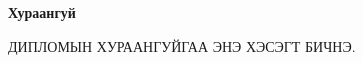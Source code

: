 

\begin{center}
{\scshape\Large \univname\par} %
{\scshape\large \facname\par}\vspace{0.5cm} %
{\huge\textbf{{Хураангуй}} \par}
\bigskip
{\Large{\ttitle} \par} %
\bigskip

{\normalsize \shortname \par} %
\mailaddress
\end{center}

\bigskip

ДИПЛОМЫН ХУРААНГУЙГАА ЭНЭ ХЭСЭГТ БИЧНЭ.